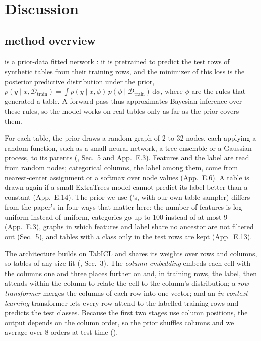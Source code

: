 \section{Discussion}\label{sec:discussion}

\subsection{\tabicl{} method overview}\label{sec:method}

\tabicl{} is a prior-data fitted network \citep{muller2022pfn}: it is
pretrained to predict the test rows of synthetic tables from their training
rows, and the minimizer of this loss is the posterior predictive
distribution under the prior,
$p(y \mid x, \mathcal{D}_{\mathrm{train}}) = \int p(y \mid x, \phi)\,
p(\phi \mid \mathcal{D}_{\mathrm{train}})\, \mathrm{d}\phi$,
where $\phi$ are the rules that generated a table. A forward pass thus
approximates Bayesian inference over these rules, so the model works on real
tables only as far as the prior covers them.

For each table, the prior draws a random graph of 2 to 32 nodes, each
applying a random function, such as a small neural network, a tree ensemble
or a Gaussian process, to its parents (\citealt{qu2026tabiclv2}, Sec.~5 and
App.~E.3). Features and the label are read from random nodes; categorical
columns, the label among them, come from nearest-center assignment or a
softmax over node values (App.~E.6). A table is drawn again if a small
ExtraTrees model cannot predict its label better than a constant
(App.~E.14). The prior we use (\nanotabicl{}'s, with our own table sampler)
differs from the paper's in four ways that matter here: the number of
features is log-uniform instead of uniform, categories go up to 100 instead
of at most 9 (App.~E.3), graphs in which features and label share no
ancestor are not filtered out (Sec.~5), and tables with a class only in the
test rows are kept (App.~E.13).

The architecture builds on TabICL \citep{qu2025tabicl} and shares its
weights over rows and columns, so tables of any size fit
(\citealt{qu2026tabiclv2}, Sec.~3). The \emph{column embedding} embeds each
cell with the columns one and three places further on and, in training rows,
the label, then attends within the column to relate the cell to the column's
distribution; a \emph{row transformer} merges the columns of each row into
one vector; and an \emph{in-context learning} transformer lets every row
attend to the labelled training rows and predicts the test classes.
Because the first two stages use column
positions, the output depends on the column order, so the prior shuffles
columns and we average over 8 orders at test time ().

